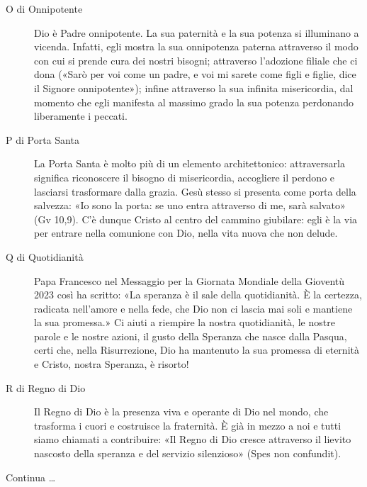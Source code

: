 \begin{description}

  \item[O di Onnipotente] Dio è Padre onnipotente. La sua paternità e la sua potenza si illuminano a vicenda. Infatti, egli mostra la sua onnipotenza paterna attraverso il modo con cui si prende cura dei nostri bisogni; attraverso l’adozione filiale che ci dona («Sarò per voi come un padre, e voi mi sarete come figli e figlie, dice il Signore onnipotente»); infine attraverso la sua infinita misericordia, dal momento che egli manifesta al massimo grado la sua potenza perdonando liberamente i peccati.

  \item[P di Porta Santa] La Porta Santa è molto più di un elemento architettonico: attraversarla significa riconoscere il bisogno di misericordia, accogliere il perdono e lasciarsi trasformare dalla grazia. Gesù stesso si presenta come porta della salvezza: «Io sono la porta: se uno entra attraverso di me, sarà salvato» (Gv 10,9). C’è dunque Cristo al centro del cammino giubilare: egli è la via per entrare nella comunione con Dio, nella vita nuova che non delude.

  \item[Q di Quotidianità] Papa Francesco nel Messaggio per la Giornata Mondiale della Gioventù 2023 così ha scritto: «La speranza è il sale della quotidianità. È la certezza, radicata nell’amore e nella fede, che Dio non ci lascia mai soli e mantiene la sua promessa.» Ci aiuti a riempire la nostra quotidianità, le nostre parole e le nostre azioni, il gusto della Speranza che nasce dalla Pasqua, certi che, nella Risurrezione, Dio ha mantenuto la sua promessa di eternità e Cristo, nostra Speranza, è risorto!

  \item[R di Regno di Dio] Il Regno di Dio è la presenza viva e operante di Dio nel mondo, che trasforma i cuori e costruisce la fraternità. È già in mezzo a noi e tutti siamo chiamati a contribuire: «Il Regno di Dio cresce attraverso il lievito nascosto della speranza e del servizio silenzioso» (Spes non confundit).
\end{description}

Continua \ldots

